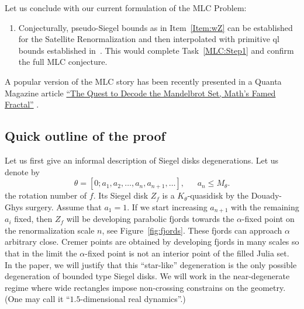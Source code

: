 \documentclass{amsart}
\renewcommand{\sp}{{\ \ }}
\newcommand{\1}{{\mathbb 1 }}
\theoremstyle{remark}
\numberwithin{equation}{section}
\theoremstyle{definition}
\begin{document}
Let us conclude with our current formulation of the MLC Problem:
\begin{enumerate}[label=\text{(\Roman*)},font=\normalfont,leftmargin=*,start=5]
\item \label{MLC:Step5} Conjecturally, pseudo-Siegel bounds as in Item~\ref{Item:wZ} can be established for the Satellite Renormalization and then interpolated with primitive ql bounds established in~\cite{molecules}. This would complete Task~\ref{MLC:Step1} and confirm the full MLC conjecture.
\end{enumerate}



A popular version of the MLC story has been recently presented in a Quanta Magazine article \href{https://www.quantamagazine.org/the-quest-to-decode-the-mandelbrot-set-maths-famed-fractal-20240126/}{``The Quest to Decode the Mandelbrot Set, Math’s Famed Fractal''} \cite{Quest}.

\subsection{Quick outline of the proof}\label{ss:outline} Let us first give an informal description of Siegel disks degenerations. Let us denote by 
\[    \theta = [0;a_1, a_2,\dots, a_n ,a_{n+1}, \dots ],\sp\sp\sp\ a_n \le M_\theta.
\] the rotation number of $f$. Its Siegel disk $Z_f$ is a $K_\theta$-quasidisk by the Douady-Ghys surgery. Assume that $a_1=1$. If we start increasing $a_{n+1}$ with the remaining $a_i$ fixed, then $Z_f$ will be developing parabolic fjords towards the $\alpha$-fixed point on the renormalization scale $n$, see Figure~\ref{fig:fjords}. These fjords can approach $\alpha$ arbitrary close. Cremer points are obtained by developing fjords in many scales so that in the limit the $\alpha$-fixed point is not an interior point of the filled Julia set. In the paper, we will justify that this ``star-like'' degeneration is the only possible degeneration of bounded type Siegel disks. We will work in the near-degenerate regime where wide rectangles impose non-crossing constrains on the geometry. (One may call it ``$1.5$-dimensional real dynamics''.) 
\end{document}

